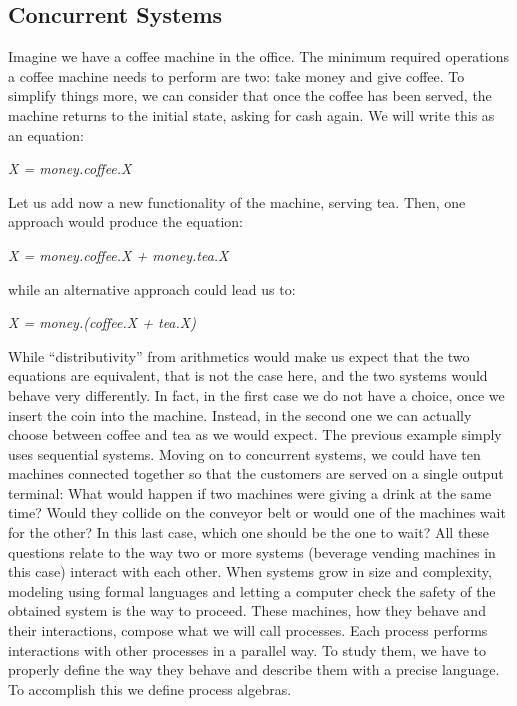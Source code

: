 \documentclass[11pt]{article}
\theoremstyle{definition}
\theoremstyle{plain}
\begin{document}
\subsection{Concurrent Systems}
Imagine we have a coffee machine in the office. The minimum required operations a coffee machine needs to perform are two: take money and give coffee. To simplify things more, we can consider that once the coffee has been served, the machine returns to the initial state, asking for cash again. We will write this as an equation:
\begin{center}
	\emph{X = money.coffee.X}
\end{center}
Let us add now a new functionality of the machine, serving tea. Then, one approach would produce the equation:
\begin{center}
	\emph{X = money.coffee.X + money.tea.X}
\end{center}
while an alternative approach could lead us to:
\begin{center}
	\emph{X = money.(coffee.X + tea.X)}
\end{center}
While ``distributivity'' from arithmetics would make us expect that the two equations are equivalent, that is not the case here, and the two systems would behave very differently. In fact, in the first case we do not have a choice, once we insert the coin into the machine. Instead, in the second one we can actually choose between coffee and tea as we would expect.
The previous example simply uses sequential systems. Moving on to concurrent systems, we could have ten machines connected together so that the customers are served on a single output terminal: What would happen if two machines were giving a drink at the same time? Would they collide on the conveyor belt or would one of the machines wait for the other? In this last case, which one should be the one to wait? All these questions relate to the way two or more systems (beverage vending machines in this case) interact with each other. When systems grow in size and complexity, modeling using formal languages and letting a computer check the safety of the obtained system is the way to proceed.
These machines, how they behave and their interactions, compose what we will call processes. Each process performs interactions with other processes in a parallel way. To study them, we have to properly define the way they behave and describe them with a precise language. To accomplish this we define process algebras.



\clearpage
\end{document}
